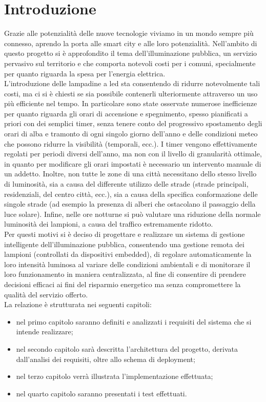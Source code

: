 \chapter{Introduzione}

Grazie alle potenzialità delle nuove tecnologie viviamo in un mondo sempre più connesso, aprendo la porta alle smart city e alle loro potenzialità.
Nell'ambito di questo progetto si è approfondito il tema dell'illuminazione pubblica, un servizio pervasivo sul territorio e che comporta notevoli costi per i comuni, specialmente per quanto riguarda la spesa per l'energia elettrica.
\\L'introduzione delle lampadine a led sta consentendo di ridurre notevolmente tali costi, ma ci si è chiesti se sia possibile contenerli ulteriormente attraverso un uso più efficiente nel tempo.
In particolare sono state osservate numerose inefficienze per quanto riguarda gli orari di accensione e spegnimento, spesso pianificati a priori con dei semplici timer, senza tenere conto del progressivo spostamento degli orari di alba e tramonto di ogni singolo giorno dell'anno e delle condizioni meteo che possono ridurre la visibilità (temporali, ecc.).
I timer vengono effettivamente regolati per periodi diversi dell'anno, ma non con il livello di granularità ottimale, in quanto per modificare gli orari impostati è necessario un intervento manuale di un addetto.
Inoltre, non tutte le zone di una città necessitano dello stesso livello di luminosità, sia a causa del differente utilizzo delle strade (strade principali, residenziali, del centro città, ecc.), sia a causa della specifica conformazione delle singole strade (ad esempio la presenza di alberi che ostacolano il passaggio della luce solare).
Infine, nelle ore notturne si può valutare una riduzione della normale luminosità dei lampioni, a causa del traffico estremamente ridotto.
\\Per questi motivi si è deciso di progettare e realizzare un sistema di gestione intelligente dell'illuminazione pubblica, consentendo una gestione remota dei lampioni (controllati da dispositivi embedded), di regolare automaticamente la loro intensità luminosa al variare delle condizioni ambientali e di monitorare il loro funzionamento in maniera centralizzata, al fine di consentire di prendere decisioni efficaci ai fini del risparmio energetico ma senza compromettere la qualità del servizio offerto.
\\La relazione è strutturata nei seguenti capitoli:
\begin{itemize}
 \item nel primo capitolo saranno definiti e analizzati i requisiti del sistema che si intende realizzare;
 \item nel secondo capitolo sarà descritta l'architettura del progetto, derivata dall'analisi dei requisiti, oltre allo schema di deployment;
 \item nel terzo capitolo verrà illustrata l'implementazione effettuata;
 \item nel quarto capitolo saranno presentati i test effettuati.
\end{itemize}
